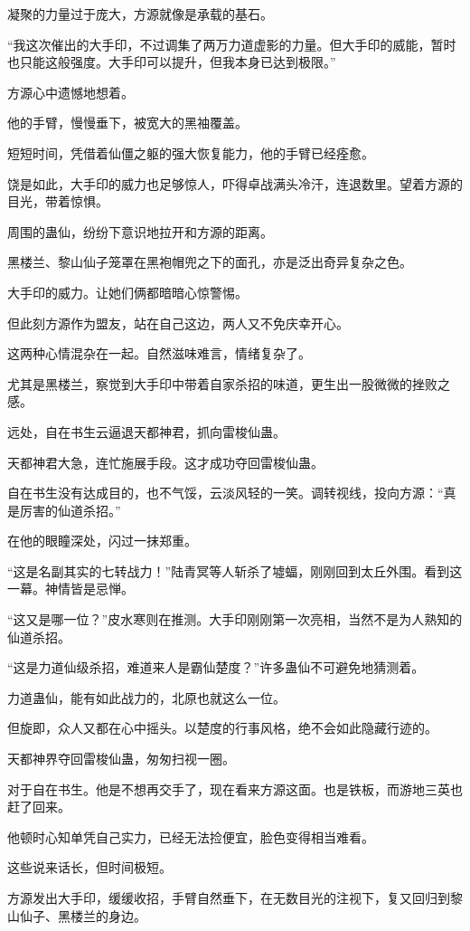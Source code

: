 \begin{this_body}
凝聚的力量过于庞大，方源就像是承载的基石。

“我这次催出的大手印，不过调集了两万力道虚影的力量。但大手印的威能，暂时也只能这般强度。大手印可以提升，但我本身已达到极限。”

方源心中遗憾地想着。

他的手臂，慢慢垂下，被宽大的黑袖覆盖。

短短时间，凭借着仙僵之躯的强大恢复能力，他的手臂已经痊愈。

饶是如此，大手印的威力也足够惊人，吓得卓战满头冷汗，连退数里。望着方源的目光，带着惊惧。

周围的蛊仙，纷纷下意识地拉开和方源的距离。

黑楼兰、黎山仙子笼罩在黑袍帽兜之下的面孔，亦是泛出奇异复杂之色。

大手印的威力。让她们俩都暗暗心惊警惕。

但此刻方源作为盟友，站在自己这边，两人又不免庆幸开心。

这两种心情混杂在一起。自然滋味难言，情绪复杂了。

尤其是黑楼兰，察觉到大手印中带着自家杀招的味道，更生出一股微微的挫败之感。

远处，自在书生云逼退天都神君，抓向雷梭仙蛊。

天都神君大急，连忙施展手段。这才成功夺回雷梭仙蛊。

自在书生没有达成目的，也不气馁，云淡风轻的一笑。调转视线，投向方源：“真是厉害的仙道杀招。”

在他的眼瞳深处，闪过一抹郑重。

“这是名副其实的七转战力！”陆青冥等人斩杀了墟蝠，刚刚回到太丘外围。看到这一幕。神情皆是忌惮。

“这又是哪一位？”皮水寒则在推测。大手印刚刚第一次亮相，当然不是为人熟知的仙道杀招。

“这是力道仙级杀招，难道来人是霸仙楚度？”许多蛊仙不可避免地猜测着。

力道蛊仙，能有如此战力的，北原也就这么一位。

但旋即，众人又都在心中摇头。以楚度的行事风格，绝不会如此隐藏行迹的。

天都神界夺回雷梭仙蛊，匆匆扫视一圈。

对于自在书生。他是不想再交手了，现在看来方源这面。也是铁板，而游地三英也赶了回来。

他顿时心知单凭自己实力，已经无法捡便宜，脸色变得相当难看。

这些说来话长，但时间极短。

方源发出大手印，缓缓收招，手臂自然垂下，在无数目光的注视下，复又回归到黎山仙子、黑楼兰的身边。


\end{this_body}
